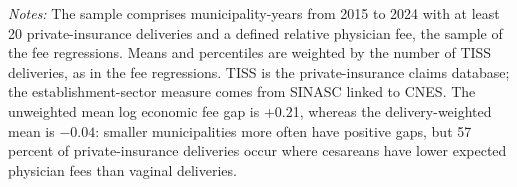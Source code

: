 \begin{table}[H]\centering
\caption{\textbf{Municipality-year summary statistics}}\label{tab:descriptives}
\small
\small\setlength{\tabcolsep}{4pt}
\begin{minipage}{\linewidth}\footnotesize
\textit{Notes:} The sample comprises municipality-years from 2015 to 2024 with at least 20 private-insurance deliveries and a defined relative physician fee, the sample of the fee regressions. Means and percentiles are weighted by the number of TISS deliveries, as in the fee regressions. TISS is the private-insurance claims database; the establishment-sector measure comes from SINASC linked to CNES. The unweighted mean log economic fee gap is +0.21, whereas the delivery-weighted mean is $-0.04$: smaller municipalities more often have positive gaps, but 57 percent of private-insurance deliveries occur where cesareans have lower expected physician fees than vaginal deliveries.
\end{minipage}
\end{table}
